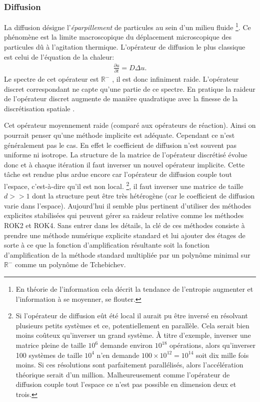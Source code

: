 \subsubsection{Diffusion}
    La diffusion désigne l'\textit{éparpillement} de particules au sein d'un milieu fluide
    \footnote{En théorie de l'information cela décrit la tendance de l'entropie augmenter et l'information à se moyenner, se flouter.}.
    Ce phénomène est la limite macroscopique du déplacement microscopique
    des particules dû à l'agitation thermique. L'opérateur de diffusion le plus classique est celui de l'équation de la chaleur:
    \begin{align} \frac{\partial u}{\partial t} = D \Delta u.\end{align}
    Le spectre de cet opérateur est $\mathbb R^-$ \cite[Chap.~9]{LeVeque2007}, il est donc infiniment raide. 
    L'opérateur discret correspondant ne capte qu'une partie de ce spectre.
    En pratique la raideur de l'opérateur discret augmente de manière quadratique avec la finesse de la discrétisation spatiale \cite[Chap.~9]{LeVeque2007}.\par
    Cet opérateur moyennement raide (comparé aux opérateurs de réaction). Ainsi on pourrait penser qu'une méthode implicite est adéquate. Cependant ce n'est généralement pas le cas.
    En effet le coefficient de diffusion n'est souvent pas uniforme ni isotrope. La structure de la matrice de l'opérateur discrétisé évolue donc et
    à chaque itération il faut inverser un nouvel opérateur implicite. Cette tâche est rendue plus ardue encore car l'opérateur de diffusion couple tout l'espace,
    c'est-à-dire qu'il est non local.
    \footnote{Si l'opérateur de diffusion eût été local il aurait pu être inversé en résolvant plusieurs petits systèmes et ce, potentiellement en parallèle.
    Cela serait bien moins coûteux qu'inverser un grand système. 
    À titre d'exemple, inverser une matrice pleine de taille $10^6$ demande environ $10^{18}$ opérations, alors qu'inverser 100 systèmes de taille $10^4$
    n'en demande $100 \times 10^{12} = 10^{14}$ soit dix mille fois moins. Si ces résolutions sont parfaitement parallélisés, alors l'accélération théorique serait d'un million. Malheureusement comme
    l'opérateur de diffusion couple tout l'espace ce n'est pas possible en dimension deux et trois.},
    il faut inverser une matrice de taille $d >> 1$ dont la structure
    peut être très hétérogène (car le coefficient de diffusion varie dans l'espace). Aujourd'hui il semble plus pertinent
    d'utiliser des méthodes explicites stabilisées qui peuvent gérer sa raideur relative comme les méthodes 
    ROK2 et ROK4\cite{abdulle2002fourth}. Sans entrer dans les détails, la clé de ces méthodes consiste à prendre une méthode numérique explicite standard et lui ajouter des étages 
    de sorte à ce que la fonction d'amplification résultante soit la fonction d'amplification de la méthode standard multipliée par un polynôme minimal sur $\mathbb R^-$
    comme un polynôme de Tchebichev.

